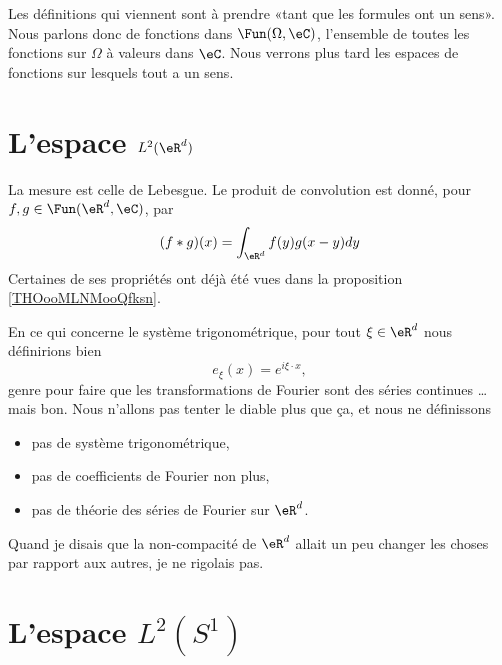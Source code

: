 Les définitions qui viennent sont à prendre «tant que les formules ont un sens». Nous parlons donc de fonctions dans \( \Fun(\Omega,\eC)\), l'ensemble de toutes les fonctions sur \( \Omega\) à valeurs dans \( \eC\). Nous verrons plus tard les espaces de fonctions sur lesquels tout a un sens.

\section{L'espace \( L^2(\eR^d)\)}

La mesure est celle de Lebesgue. Le produit de convolution est donné, pour \( f,g\in\Fun(\eR^d,\eC)\), par
\begin{equation}
    (f*g)(x)=\int_{\eR^d}f(y)g(x-y)dy
\end{equation}
Certaines de ses propriétés ont déjà été vues dans la proposition \ref{THOooMLNMooQfksn}.

En ce qui concerne le système trigonométrique, pour tout \( \xi\in \eR^d\) nous définirions bien
\begin{equation}
    e_{\xi}(x)= e^{i\xi\cdot x},
\end{equation}
genre pour faire que les transformations de Fourier sont des séries continues \ldots mais bon. Nous n'allons pas tenter le diable plus que ça, et nous ne définissons 
\begin{itemize}
    \item pas de système trigonométrique,
    \item pas de coefficients de Fourier non plus,
    \item pas de théorie des séries de Fourier sur \( \eR^d\).
\end{itemize}
Quand je disais que la non-compacité de \( \eR^d\) allait un peu changer les choses par rapport aux autres, je ne rigolais pas.

\section{L'espace \( L^2(S^1)\)}

